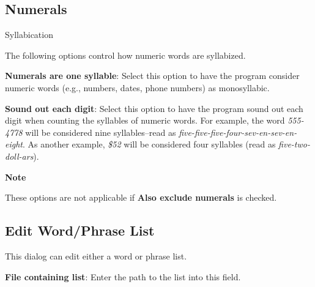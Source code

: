 \documentclass[
]{book}
\newenvironment{notesection}
    {
    \begin{tcolorbox}[colframe=mediumblue,colback=lightblue,coltext=mediumblue,arc=3mm]
    \faLightbulb[regular] \textbf{Note} \newline
    }
    {
    \end{tcolorbox}
    }
\newenvironment{optionssection}
    {
    \begin{tcolorbox}[colframe=lightgray,colback=ultralightgray,sharp corners=all,parbox=false]
    }
    {
    \end{tcolorbox}
    }
\newenvironment{optionssectiontitle}
    {
    \begin{tcolorbox}[colframe=lightgray,colback=lightgray]
    \bfseries
    }
    {
    \end{tcolorbox}
    }
\theoremstyle{definition}
\theoremstyle{definition}
\theoremstyle{definition}
\theoremstyle{definition}
\theoremstyle{remark}
\begin{document}
\hypertarget{numsyllable}{%
\subsection*{Numerals}\label{numsyllable}}

\begin{optionssection}

\begin{optionssectiontitle}
Syllabication

\end{optionssectiontitle}

The following options control how numeric words are syllabized.

\textbf{Numerals are one syllable}: Select this option to have the program consider numeric words (e.g., numbers, dates, phone numbers) as monosyllabic.

\textbf{Sound out each digit}: Select this option to have the program sound out each digit when counting the syllables of numeric words. For example, the word \emph{555-4778} will be considered nine syllables--read as \emph{five-five-five-four-sev-en-sev-en-eight}. As another example, \emph{\$52} will be considered four syllables (read as \emph{five-two-doll-ars}).

\end{optionssection}

\begin{notesection}
These options are not applicable if \textbf{Also exclude numerals} is checked.

\end{notesection}

\hypertarget{edit-word-list-dialog}{%
\subsection*{Edit Word/Phrase List}\label{edit-word-list-dialog}}

This dialog can edit either a word or phrase list.

\textbf{File containing list}: Enter the path to the list into this field.
\end{document}
